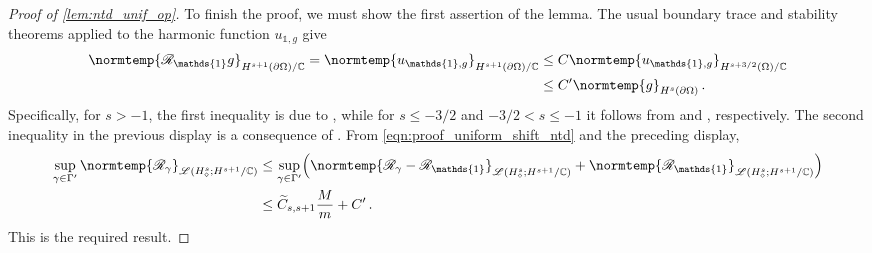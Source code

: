 \documentclass[pdflatex,sn-mathphys-num]{sn-jnl-preprint}
\newcommand{\C}{\mathbb{C}}
\newcommand{\sL}{\mathscr{L}}
\newcommand{\sR}{\mathscr{R}}
\newcommand{\pOmega}{{\partial\Omega}}
\newcommand{\ntd}{\mathscr{R}_{\gamma}}
\newcommand{\norm}{\normtemp}
\newcommand{\onebm}{\mathds{1}} %
\theoremstyle{thmstyleone}%
\theoremstyle{thmstyletwo}%
\theoremstyle{thmstylethree}%
\numberwithin{equation}{section}
\numberwithin{theorem}{section}
\begin{document}
\begin{appendices}
\begin{proof}[Proof of \cref{lem:ntd_unif_op}]
    To finish the proof, we must show the first assertion of the lemma. The usual boundary trace and stability theorems applied to the harmonic function  $u_{\onebm,g}$ give
    \begin{align*}
        \norm{\sR_{\onebm}g}_{H^{s+1}(\pOmega)/\C} = \norm{u_{\onebm,g}}_{H^{s+1}(\pOmega)/\C}&\leq C\norm{u_{\onebm,g}}_{H^{s+3/2}(\Omega)/\C}\\
        &\leq C' \norm{g}_{H^s(\pOmega)}\,.
    \end{align*}
    Specifically, for $s>-1$, the first inequality is due to \cite[Chp.~1, Thm.~9.4, pp.~41--42, taking $\mu=1$, $m=1$, and $s=s+3/2$]{lions2012non}, while for $s\leq -3/2$ and $-3/2<s\leq -1 $ it follows from \cite[Chp.~2, Thm.~6.5 and Remark 6.4, pp.~175--177, taking $m=1$, $m_0=0$, $r=-s-3/2$, and $A=-\Delta$]{lions2012non} and \cite[Chp.~2, Thm.~7.3, pp.~187--188, taking $m=1$, $m_0=0$, $0<s=s+3/2<2$, and $A=-\Delta$]{lions2012non}, respectively. The second inequality in the previous display is a consequence of \cite[Chp.~2, Remark 7.2, pp.~188--189, taking $\Omega=\Omega$, $A=-\Delta$, $f\equiv 0$, $s=s+3/2$, $m=m_0=1$, $g_0=g$, and $N=\{z\onebm\colon z\in\C\}$]{lions2012non}.
    From \eqref{eqn:proof_uniform_shift_ntd} and the preceding display,
    \begin{align*}
        \sup_{\gamma\in\Gamma'} \norm{\ntd}_{\sL({H}_\diamond^s;H^{s+1}/\C)}&\leq \sup_{\gamma\in\Gamma'} \Bigl(\norm{\ntd - \sR_{\onebm}}_{\sL(H^s_\diamond;H^{s+1}/\C)} + \norm{\sR_{\onebm}}_{\sL(H^s_\diamond;H^{s+1}/\C)}\Bigr)\\
        &\leq \widetilde{C}_{s,s+1}\frac{M}{m} + C'\,.
    \end{align*}
    This is the required result.
\end{proof}


\end{appendices}
\end{document}
